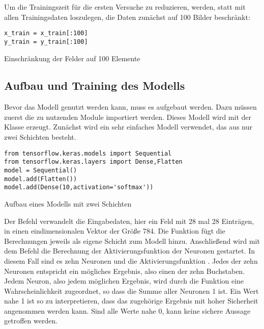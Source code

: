 Um die Trainingszeit für die ersten Versuche zu reduzieren, werden, statt mit allen Trainingsdaten loszulegen, die Daten zunächst auf 100 Bilder beschränkt:

\medskip

\begin{code}
    \begin{lstlisting}[numbers=none]
x_train = x_train[:100]
y_train = y_train[:100]
\end{lstlisting}

\caption{Einschränkung der Felder auf 100 Elemente}
\end{code}

\subsection{Aufbau und Training des Modells}

Bevor das Modell genutzt werden kann, muss es aufgebaut werden. Dazu müssen zuerst die zu nutzenden Module importiert werden. Dieses Modell wird mit der Klasse  erzeugt. Zunächst wird ein sehr einfaches Modell verwendet, das aus nur zwei Schichten besteht.

\medskip

\begin{code}
    \begin{lstlisting}[numbers=none]
from tensorflow.keras.models import Sequential
from tensorflow.keras.layers import Dense,Flatten
model = Sequential()
model.add(Flatten())
model.add(Dense(10,activation='softmax'))
\end{lstlisting}

\caption{Aufbau eines Modells mit zwei Schichten}
\end{code}

\medskip

Der Befehl  verwandelt die Eingabedaten, hier ein Feld mit 28 mal 28 Einträgen, in einen eindimensionalen Vektor der Größe 784. Die Funktion  fügt die Berechnungen jeweils als eigene Schicht zum Modell hinzu. Anschließend wird mit dem Befehl  die Berechnung der Aktivierungsfunktion der Neuronen gestartet. In diesem Fall sind es zehn Neuronen und die Aktivierungsfunktion . Jedes der zehn Neuronen entspricht ein mögliches Ergebnis, also einen der zehn Buchstaben. Jedem Neuron, also jedem möglichen Ergebnis, wird durch die Funktion   eine Wahrscheinlichkeit zugeordnet, so dass die Summe aller Neuronen 1 ist. Ein Wert nahe 1 ist so zu interpretieren, dass das zugehörige Ergebnis mit hoher Sicherheit angenommen werden kann. Sind alle Werte nahe 0, kann keine sichere Aussage getroffen werden.


